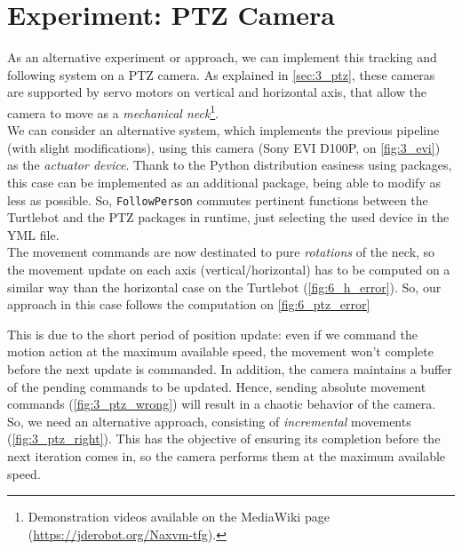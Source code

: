\section{Experiment: PTZ Camera}
	\label{sec:follow_ptz}
	As an alternative experiment or approach, we can implement this tracking and following system on a PTZ camera. As explained in \autoref{sec:3_ptz}, these cameras are supported by servo motors on vertical and horizontal axis, that allow the camera to move as a \emph{mechanical neck}\footnote{Demonstration videos available on the MediaWiki page (\url{https://jderobot.org/Naxvm-tfg}).}.\\
	
	We can consider an alternative system, which implements the previous pipeline (with slight modifications), using this camera (Sony EVI D100P, on \autoref{fig:3_evi}) as the \emph{actuator device}. Thank to the Python distribution easiness using packages, this case can be implemented as an additional package, being able to modify as less as possible. So, \texttt{FollowPerson} commutes pertinent functions between the Turtlebot and the PTZ packages in runtime, just selecting the used device in the YML file.\\
	
	The movement commands are now destinated to pure \emph{rotations} of the neck, so the movement update on each axis (vertical/horizontal) has to be computed on a similar way than the horizontal case on the Turtlebot (\autoref{fig:6_h_error}). So, our approach in this case follows the computation on \autoref{fig:6_ptz_error}
	
	
	 This is due to the short period of position update: even if we command the motion action at the maximum available speed, the movement won't complete before the next update is commanded. In addition, the camera maintains a buffer of the pending commands to be updated. Hence, sending absolute movement commands (\autoref{fig:3_ptz_wrong}) will result in a chaotic behavior of the camera.\\
	 
	 So, we need an alternative approach, consisting of \emph{incremental} movements (\autoref{fig:3_ptz_right}). This has the objective of ensuring its completion before the next iteration comes in, so the camera performs them at the maximum available speed.
	 
